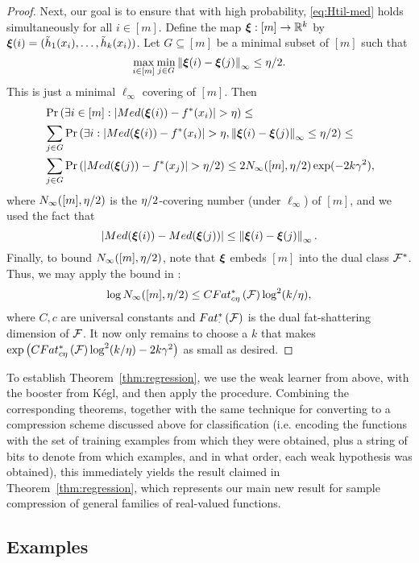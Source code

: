 \documentclass[12pt,a4paper,oneside,onecolumn]{book}
\begin{document}
\begin{proof}
Next, our goal is to ensure that
with high probability,
\eqref{eq:Htil-med} holds simultaneously for all
${i\in[m]}$.
Define the map $\boldsymbol{\xi}:[m]\to\mathbb{R}^k$
by $\boldsymbol{\xi}(i)=(\tilde{h}_{1}(x_i),\ldots,\tilde{h}_{k}(x_i))$.
Let
$G \subseteq[m]$
be a minimal subset of $[m]$ such that 
$$\max\limits_{i \in [m]} \min\limits_{j \in {G}}
\left\Vert \boldsymbol{\xi}(i)-\boldsymbol{\xi}(j) \right\Vert_\infty\le\eta/2
.
$$
This is just a minimal $\ell_\infty$ covering of $[m]$.
Then
\begin{align*}
  &\Pr\paren{
    \exists
    i
    \in[m]
    :
    |\Med(\bxi(i))-f^*(x_i)|>\dev
  }\le\\
  &\sum_{j\in G}
  \Pr\paren{
    \exists i
    :
    |\Med(\bxi(i))-f^*(x_i)|>\dev , \nrm{\bxi(i)-\bxi(j)}_\infty\le\dev/2
  }
  \le\\
  &
  \sum_{j\in G}
  \Pr\paren{
    |\Med(\bxi(j))-f^*(x_j)|>\dev /2
  }
  \le 2N_\infty([m],\dev/2)\exp(-2k\adv^2),
\end{align*}
where $N_\infty([m],\eta/2)$ is the $\eta /2$-covering number (under $\ell_\infty$)
of $[m]$,
and we used the fact that
$$|Med(\boldsymbol{\xi}(i))-Med(\boldsymbol{\xi}(j))|\le\left\Vert \boldsymbol{\xi}(i)-\boldsymbol{\xi}(j) \right\Vert_\infty.$$
Finally, to bound $N_\infty([m],\eta/2)$, note that
$\boldsymbol{\xi}$
embeds
$[m]$
into the dual
class
$\mathcal{F}^*$.
Thus, we may apply
the bound in \cite[Display (1.4)]{MR2247969}:
$$
\log N_\infty([m],\eta/2)\le C 
Fat^*_{c\eta}\left(\mathcal{F}\right)\log^2(k/\eta),
$$
where $C,c$ are universal constants and $Fat^*_{\cdot}\left(\mathcal{F}\right)$ 
is the dual fat-shattering dimension of $\mathcal{F}$.
It now only remains to choose a $k$
that makes
$\exp\left( C Fat^*_{c\eta}\left(\mathcal{F}\right)\log^2(k/\eta)-2k\gamma^2 \right)$
as small as desired.
\end{proof}

To establish Theorem~\ref{thm:regression}, 
we use the weak learner from above, with the booster  from K\'{e}gl, and then apply the  procedure. 
Combining the corresponding theorems, together with the same technique for converting to a compression scheme 
discussed above for classification (i.e. encoding the functions with the set of training examples from which they were obtained, plus a string of bits to denote from which examples, and in what order, each weak hypothesis was obtained), 
this immediately yields the result claimed in Theorem~\ref{thm:regression}, 
which represents our main new result for sample compression of general families of real-valued functions.




\subsection{Examples}
\label{sec:examples}
\end{document}

